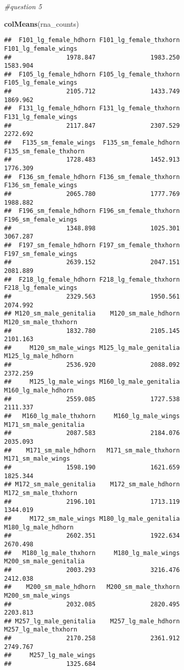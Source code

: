 \documentclass[]{article}
\newenvironment{Shaded}{\begin{snugshade}}{\end{snugshade}}
\newcommand{\KeywordTok}[1]{\textcolor[rgb]{0.13,0.29,0.53}{\textbf{#1}}}
\newcommand{\CommentTok}[1]{\textcolor[rgb]{0.56,0.35,0.01}{\textit{#1}}}
\newcommand{\NormalTok}[1]{#1}
\begin{document}
\begin{Shaded}
\begin{Highlighting}[]
\CommentTok{#question 5 }

\KeywordTok{colMeans}\NormalTok{(rna_counts)}
\end{Highlighting}
\end{Shaded}

\begin{verbatim}
##  F101_lg_female_hdhorn F101_lg_female_thxhorn   F101_lg_female_wings 
##               1978.847               1983.250               1583.904 
##  F105_lg_female_hdhorn F105_lg_female_thxhorn   F105_lg_female_wings 
##               2105.712               1433.749               1869.962 
##  F131_lg_female_hdhorn F131_lg_female_thxhorn   F131_lg_female_wings 
##               2117.847               2307.529               2272.692 
##   F135_sm_female_wings  F135_sm_female_hdhorn F135_sm_female_thxhorn 
##               1728.483               1452.913               1776.309 
##  F136_sm_female_hdhorn F136_sm_female_thxhorn   F136_sm_female_wings 
##               2065.780               1777.769               1988.882 
##  F196_sm_female_hdhorn F196_sm_female_thxhorn   F196_sm_female_wings 
##               1348.898               1025.301               3067.287 
##  F197_sm_female_hdhorn F197_sm_female_thxhorn   F197_sm_female_wings 
##               2639.152               2047.151               2081.889 
##  F218_lg_female_hdhorn F218_lg_female_thxhorn   F218_lg_female_wings 
##               2329.563               1950.561               2074.992 
## M120_sm_male_genitalia    M120_sm_male_hdhorn   M120_sm_male_thxhorn 
##               1832.780               2105.145               2101.163 
##     M120_sm_male_wings M125_lg_male_genitalia    M125_lg_male_hdhorn 
##               2536.920               2088.092               2372.259 
##     M125_lg_male_wings M160_lg_male_genitalia    M160_lg_male_hdhorn 
##               2559.085               1727.538               2111.337 
##   M160_lg_male_thxhorn     M160_lg_male_wings M171_sm_male_genitalia 
##               2087.583               2184.076               2035.093 
##    M171_sm_male_hdhorn   M171_sm_male_thxhorn     M171_sm_male_wings 
##               1598.190               1621.659               1825.344 
## M172_sm_male_genitalia    M172_sm_male_hdhorn   M172_sm_male_thxhorn 
##               2196.101               1713.119               1344.019 
##     M172_sm_male_wings M180_lg_male_genitalia    M180_lg_male_hdhorn 
##               2602.351               1922.634               2670.498 
##   M180_lg_male_thxhorn     M180_lg_male_wings M200_sm_male_genitalia 
##               2003.293               3216.476               2412.038 
##    M200_sm_male_hdhorn   M200_sm_male_thxhorn     M200_sm_male_wings 
##               2032.085               2820.495               2203.813 
## M257_lg_male_genitalia    M257_lg_male_hdhorn   M257_lg_male_thxhorn 
##               2170.258               2361.912               2749.767 
##     M257_lg_male_wings 
##               1325.684
\end{verbatim}
\end{document}
